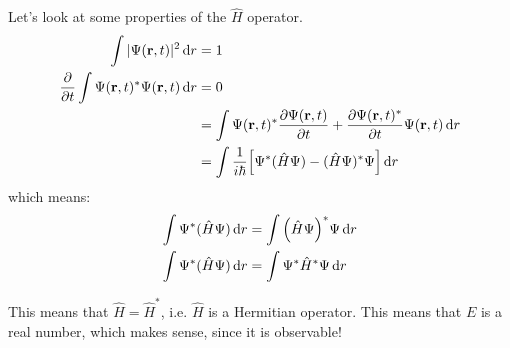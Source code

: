 Let's look at some properties of the $\hat{H}$ operator.
\begin{align*}
    \int |\Psi(\mbf{r}, t)|^2 \dd{r} &= 1 \\
    \partialderivative{}{t} \int \Psi(\mbf{r}, t)^* \Psi(\mbf{r}, t) \dd{r} &= 0 \\
    &= \int \Psi(\mbf{r}, t)^* \partialderivative{\Psi(\mbf{r}, t)}{t} + \partialderivative{\Psi(\mbf{r}, t)^*}{t} \Psi(\mbf{r}, t) \dd{r} \\
    &= \int \frac{1}{i \hbar} \qty[\Psi^* (\hat{H} \Psi) - (\hat{H} \Psi)^* \Psi] \dd{r} \\
\end{align*}
which means:
\begin{align*}
    \int \Psi^*(\hat{H} \Psi) \dd{r} &= \int \qty(\hat{H} \Psi)^* \Psi \dd{r} \\
    \int \Psi^*(\hat{H} \Psi) \dd{r} &= \int \Psi^* \hat{H}^* \Psi \dd{r}
\end{align*}

This means that $\hat{H} = \hat{H}^*$, i.e. $\hat{H}$ is a Hermitian operator. This means that $E$ is a real number, which makes sense,
since it is observable!